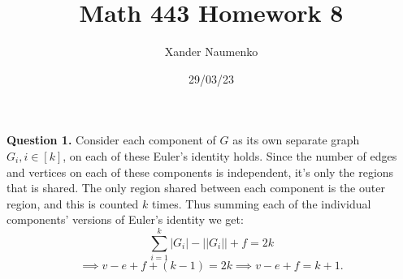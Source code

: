 \documentclass[letterpaper, reqno,11pt]{article}
\begin{document}
\title{Math 443 Homework 8}
\date{29/03/23}
\author{Xander Naumenko}
\maketitle

{\medskip\noindent\bf Question 1.} Consider each component of $G$ as its own separate graph $G_i,i\in [k]$, on each of these Euler's identity holds. Since the number of edges and vertices on each of these components is independent, it's only the regions that is shared. The only region shared between each component is the outer region, and this is counted $k$ times. Thus summing each of the individual components' versions of Euler's identity we get: 
\[
\sum_{i=1}^{k} |G_i|-| |G_i| |+f=2k
\]
\[
\implies v-e+f+(k-1)=2k\implies v-e+f=k+1
.\]
\end{document}

